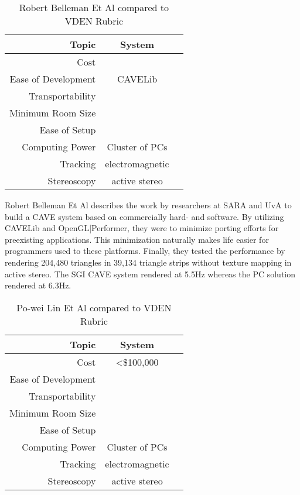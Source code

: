 \begin{table}[H]
	\centering
	\renewcommand\arraystretch{0.5}
	\begin{tabular}{r|c|c}
		\hline 
		Topic & System &  \\ 
		\hline 
		Cost 				& \ns 				& \cross \\ 
		Ease of Development & CAVELib 			& \cross \\ 
		Transportability 	& \ns 				& \cross \\ 
		Minimum Room Size 	& \ns 				& \cross \\ 
		Ease of Setup 		& \ns 				& \cross \\ 
		Computing Power 	& Cluster of PCs 	& \cross \\ 
		Tracking 			& electromagnetic 	& \cross \\ 
		Stereoscopy 		& active stereo 	& \checkmark \\ 
		\hline 
	\end{tabular} 
	
	\caption{Robert Belleman Et Al compared to VDEN Rubric} \label{tab:bellemanRubric}
\end{table}

Robert Belleman Et Al describes the work by researchers at SARA and UvA to build a CAVE system based on commercially hard- and software. By utilizing CAVELib and OpenGL|Performer, they were to minimize porting efforts for preexisting applications. This minimization naturally makes life easier for programmers used to these platforms. Finally, they tested the performance by rendering 204,480 triangles in 39,134 triangle strips without texture mapping in active stereo. The SGI CAVE system rendered at 5.5Hz whereas the PC solution rendered at 6.3Hz.

\filbreak
{}

\begin{table}[H]
	\centering
	\renewcommand\arraystretch{0.5}
	\begin{tabular}{r|c|c}
		\hline 
		Topic & System &  \\ 
		\hline 
		Cost 				& \textless \$100,000 	& \cross \\ 
		Ease of Development & \ns 					& \cross \\ 
		Transportability 	& \ns  					& \cross \\ 
		Minimum Room Size 	& \ns 					& \cross \\ 
		Ease of Setup 		& \ns					& \cross \\ 
		Computing Power 	& Cluster of PCs 		& \cross \\ 
		Tracking 			& electromagnetic 		& \cross \\ 
		Stereoscopy 		& active stereo 		& \checkmark \\ 
		\hline 
	\end{tabular} 
	
	\caption{Po-wei Lin Et Al compared to VDEN Rubric} \label{tab:poweiRubric}
\end{table}

